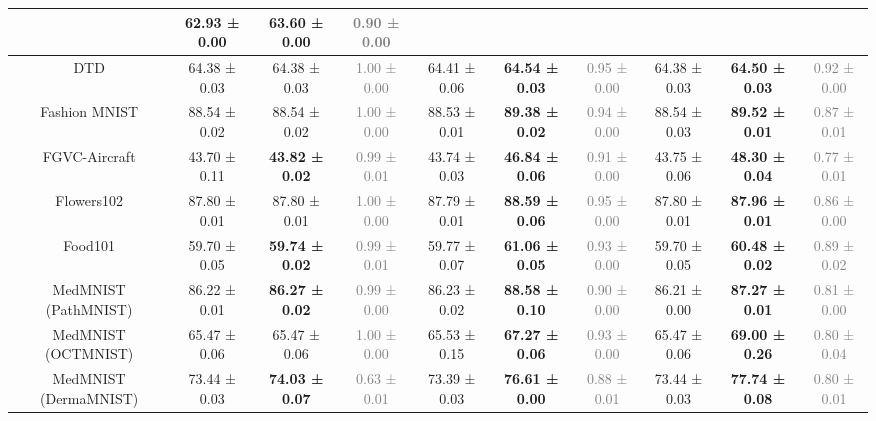 \begin{table*}[h]
\begin{center}
\begin{small}
{\begin{tabular}{|c|c|c|c|c|c|c|c|c|c|}
                  & 62.93 ± 0.00 & \textbf{63.60 ± 0.00} & \textcolor{gray}{0.90 ± 0.00}  \\ \hline
DTD               & 64.38 ± 0.03 & 64.38 ± 0.03 & \textcolor{gray}{1.00 ± 0.00} 
                  & 64.41 ± 0.06 & \textbf{64.54 ± 0.03} & \textcolor{gray}{0.95 ± 0.00}
                  & 64.38 ± 0.03 & \textbf{64.50 ± 0.03} & \textcolor{gray}{0.92 ± 0.00} \\ \hline
Fashion MNIST     & 88.54 ± 0.02 & 88.54 ± 0.02 & \textcolor{gray}{1.00 ± 0.00}
                  & 88.53 ± 0.01 & \textbf{89.38 ± 0.02} & \textcolor{gray}{0.94 ± 0.00}
                  & 88.54 ± 0.03 & \textbf{89.52 ± 0.01} & \textcolor{gray}{0.87 ± 0.01} \\ \hline
FGVC-Aircraft     & 43.70 ± 0.11 & \textbf{43.82 ± 0.02} & \textcolor{gray}{0.99 ± 0.01} 
                  & 43.74 ± 0.03 & \textbf{46.84 ± 0.06} & \textcolor{gray}{0.91 ± 0.00}
                  & 43.75 ± 0.06 & \textbf{48.30 ± 0.04} & \textcolor{gray}{0.77 ± 0.01} \\ \hline
Flowers102        & 87.80 ± 0.01 & 87.80 ± 0.01 & \textcolor{gray}{1.00 ± 0.00} 
                  & 87.79 ± 0.01 & \textbf{88.59 ± 0.06} & \textcolor{gray}{0.95 ± 0.00}
                  & 87.80 ± 0.01 & \textbf{87.96 ± 0.01} & \textcolor{gray}{0.86 ± 0.00} \\ \hline
Food101           & 59.70 ± 0.05 & \textbf{59.74 ± 0.02} & \textcolor{gray}{0.99 ± 0.01} 
                  & 59.77 ± 0.07 & \textbf{61.06 ± 0.05} & \textcolor{gray}{0.93 ± 0.00}
                  & 59.70 ± 0.05 & \textbf{60.48 ± 0.02} & \textcolor{gray}{0.89 ± 0.02}  \\ \hline
MedMNIST 
(PathMNIST)       & 86.22 ± 0.01 & \textbf{86.27 ± 0.02} & \textcolor{gray}{0.99 ± 0.00} 
                  & 86.23 ± 0.02 & \textbf{88.58 ± 0.10} & \textcolor{gray}{0.90 ± 0.00}
                  & 86.21 ± 0.00 & \textbf{87.27 ± 0.01} & \textcolor{gray}{0.81 ± 0.00} \\ \hline
MedMNIST 
(OCTMNIST)        & 65.47 ± 0.06 & 65.47 ± 0.06 & \textcolor{gray}{1.00 ± 0.00} 
                  & 65.53 ± 0.15 & \textbf{67.27 ± 0.06} & \textcolor{gray}{0.93 ± 0.00}
                  & 65.47 ± 0.06 & \textbf{69.00 ± 0.26} & \textcolor{gray}{0.80 ± 0.04} \\ \hline
MedMNIST 
(DermaMNIST)      & 73.44 ± 0.03 & \textbf{74.03 ± 0.07} & \textcolor{gray}{0.63 ± 0.01} 
                  & 73.39 ± 0.03 & \textbf{76.61 ± 0.00} & \textcolor{gray}{0.88 ± 0.01}
                  & 73.44 ± 0.03 & \textbf{77.74 ± 0.08} & \textcolor{gray}{0.80 ± 0.01} \\ \hline

\end{tabular}}
\end{small}
\end{center}
\end{table*}
